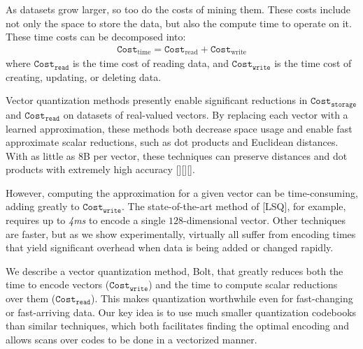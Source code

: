 


As datasets grow larger, so too do the costs of mining them. These costs include not only the space to store the data, but also the compute time to operate on it. These time costs can be decomposed into:
\begin{align}
    \texttt{Cost}_{\text{time}} = \texttt{Cost}_{\text{read}} + \texttt{Cost}_{\text{write}}
\end{align}
where $\texttt{Cost}_{\texttt{read}}$ is the time cost of reading data, and $\texttt{Cost}_{\texttt{write}}$ is the time cost of creating, updating, or deleting data.

Vector quantization methods presently enable significant reductions in $\texttt{Cost}_{\texttt{storage}}$ and $\texttt{Cost}_{\texttt{read}}$ on datasets of real-valued vectors. By replacing each vector with a learned approximation, these methods both decrease space usage and enable fast approximate scalar reductions, such as dot products and Euclidean distances. With as little as 8B per vector, these techniques can preserve distances and dot products with extremely high accuracy [][][].






However, computing the approximation for a given vector can be time-consuming, adding greatly to $\texttt{Cost}_{\texttt{write}}$. The state-of-the-art method of [LSQ], for example, requires up to \textit{4ms} to encode a single $128$-dimensional vector. Other techniques are faster, but as we show experimentally, virtually all suffer from encoding times that yield significant overhead when data is being added or changed rapidly.

We describe a vector quantization method, Bolt, that greatly reduces both the time to encode vectors ($\texttt{Cost}_{\texttt{write}}$) and the time to compute scalar reductions over them ($\texttt{Cost}_{\texttt{read}}$). This makes quantization worthwhile even for fast-changing or fast-arriving data. Our key idea is to use much smaller quantization codebooks than similar techniques, which both facilitates finding the optimal encoding and allows scans over codes to be done in a vectorized manner.

